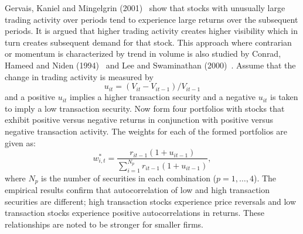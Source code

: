 Gervais, Kaniel and Mingelgrin (2001)~\cite{germing} show that stocks with unusually large trading activity over periods tend to experience large returns over the subsequent periods. It is argued that higher trading activity creates higher visibility which in turn creates subsequent demand for that stock. This approach where contrarian or momentum is characterized by trend in volume is also studied by Conrad, Hameed and Niden (1994)~\cite{conniden} and Lee and Swaminathan (2000)~\cite{lee2000}. Assume that the change in trading activity is measured by
	\begin{equation} \label{eqn:uit3}
	u_{it}= (V_{it} - V_{it-1}) / V_{it-1}
	\end{equation}   
and a positive $u_{it}$ implies a higher transaction security and a negative $u_{it}$ is taken to imply a low transaction security. Now form four portfolios with stocks that exhibit positive versus negative returns in conjunction with positive versus negative transaction activity. The weights for each of the formed portfolios are given as:
	\begin{equation} \label{eqn:wip3}
	w^*_{i,t} = \dfrac{r_{it-1}(1+u_{it-1})}{\sum_{i=1}^{N_p} r_{it-1}(1+u_{it-1})},
	\end{equation}
where $N_p$ is the number of securities in each combination ($p=1, \ldots, 4$). The empirical results confirm that autocorrelation of low and high transaction securities are different; high transaction stocks experience price reversals and low transaction stocks experience positive autocorrelations in returns. These relationships are noted to be stronger for smaller firms. 


